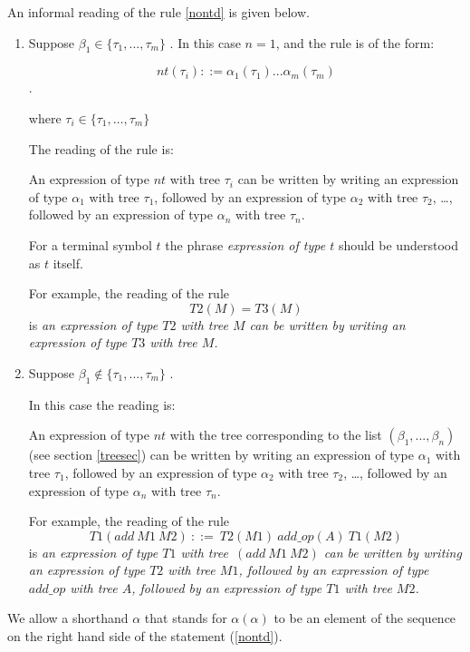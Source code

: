 \documentclass[a4paper,10pt]{article}
\begin{document}
An informal reading of the rule \ref{nontd} is given below.
\begin{enumerate}

\item  Suppose $\beta_1 \in \{\tau_1,...,\tau_m\}$ .
In this case $n = 1$, and the rule is of the form:

$$nt (\tau_i) ::= \alpha_1(\tau_1) ... \alpha_m(\tau_m)$$.

where $\tau_i \in \{\tau_1,\ldots,\tau_m\}$

The reading of the rule is:

An expression of type $nt$ with tree $\tau_i$ can be written by writing an expression of type $\alpha_1$ with tree $\tau_1$, followed by an expression of type $\alpha_2$ with tree $\tau_2$, \ldots, followed by an expression of type $\alpha_n$ with tree $\tau_n$.

For a terminal symbol $t$ the phrase \textit{expression of type $t$} should be understood as $t$ itself.

For example, the reading of the rule
$$T2(M) = T3(M)$$
is \textit{an expression of type $T2$ with tree $M$ can be written by writing an expression of type $T3$ with tree $M$.} 


\item  Suppose  $\beta_1 \not\in \{\tau_1,...,\tau_m\}$ .

In this case the reading is:

An expression of type $nt$ with the tree corresponding to the list $(\beta_1,...,\beta_n)$ (see section \ref{treesec}) can be written by writing an expression of type $\alpha_1$ with tree $\tau_1$, followed by an expression of type $\alpha_2$ with tree $\tau_2$, \ldots, followed by an expression of type $\alpha_n$ with tree $\tau_n$.

For example, the reading of the rule
$$T1(add~M1~M2)~::=~T2(M1)~add\_op(A)~T1(M2)$$
is \textit{an expression of type $T1$ with tree~$(add~M1~M2)$ can be written by writing an expression of type $T2$ with tree $M1$, followed by an expression of type $add\_op$ with tree $A$, followed by an expression of type $T1$ with tree $M2$.} 

\end{enumerate}


We allow a shorthand $\alpha$ that stands for $\alpha(\alpha)$ to be an element of the sequence on the right hand side of the statement (\ref{nontd}). 
\end{document}

